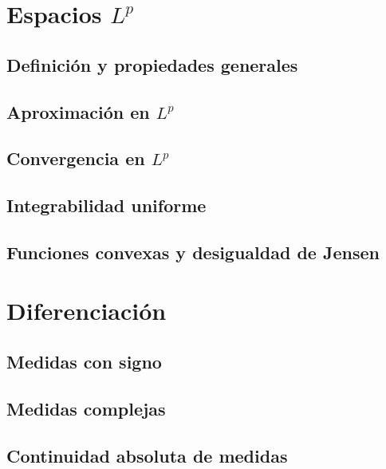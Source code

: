 \documentclass[12pt,]{krantz}
\theoremstyle{definition}
\theoremstyle{definition}
\theoremstyle{definition}
\theoremstyle{remark}
\begin{document}
\chapter{\texorpdfstring{Espacios
\(L^p\)}{Espacios L\^{}p}}\label{espacios-lp}

\section{Definición y propiedades
generales}\label{definicion-y-propiedades-generales}

\section{\texorpdfstring{Aproximación en
\(L^p\)}{Aproximación en L\^{}p}}\label{aproximacion-en-lp}

\section{\texorpdfstring{Convergencia en
\(L^p\)}{Convergencia en L\^{}p}}\label{convergencia-en-lp}

\section{Integrabilidad uniforme}\label{integrabilidad-uniforme}

\section{Funciones convexas y desigualdad de
Jensen}\label{funciones-convexas-y-desigualdad-de-jensen}

\chapter{Diferenciación}\label{diferenciacion-2}

\section{Medidas con signo}\label{medidas-con-signo}

\section{Medidas complejas}\label{medidas-complejas}

\section{Continuidad absoluta de
medidas}\label{continuidad-absoluta-de-medidas}
\end{document}
